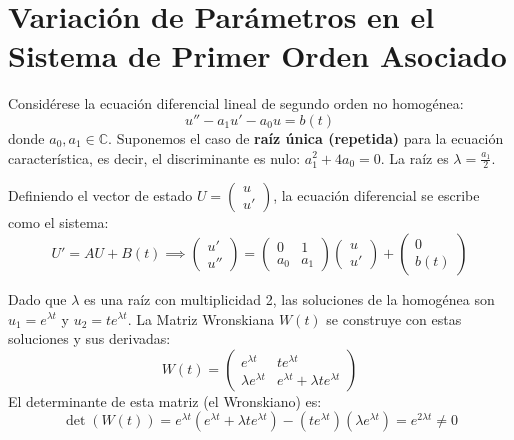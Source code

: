 \section*{Variación de Parámetros en el Sistema de Primer Orden Asociado}

Considérese la ecuación diferencial lineal de segundo orden no homogénea:
\[
    u'' - a_1 u' - a_0 u = b(t) \label{eq:edo_original}
\] 
donde $a_0, a_1 \in \mathbb{C}$. Suponemos el caso de \textbf{raíz única (repetida)} para la ecuación característica, es decir, el discriminante es nulo: $a_1^2 + 4a_0 = 0$. La raíz es $\lambda = \frac{a_1}{2}$.

Definiendo el vector de estado $U = \begin{pmatrix} u \\ u' \end{pmatrix}$, la ecuación diferencial se escribe como el sistema:
\[
    U' = A U + B(t) \implies 
    \begin{pmatrix} u' \\ u'' \end{pmatrix} = 
    \begin{pmatrix} 0 & 1 \\ a_0 & a_1 \end{pmatrix} 
    \begin{pmatrix} u \\ u' \end{pmatrix} + 
    \begin{pmatrix} 0 \\ b(t) \end{pmatrix}
\]

Dado que $\lambda$ es una raíz con multiplicidad 2, las soluciones de la homogénea son $u_1 = e^{\lambda t}$ y $u_2 = t e^{\lambda t}$. La Matriz Wronskiana $W(t)$ se construye con estas soluciones y sus derivadas:
\[
    W(t) = \begin{pmatrix}
        e^{\lambda t} & t e^{\lambda t} \\
        \lambda e^{\lambda t} & e^{\lambda t} + \lambda t e^{\lambda t}
    \end{pmatrix}
\]
El determinante de esta matriz (el Wronskiano) es:
\[
    \det (W(t)) = e^{\lambda t}(e^{\lambda t} + \lambda t e^{\lambda t}) - (t e^{\lambda t})(\lambda e^{\lambda t}) = e^{2 \lambda t} \neq 0
\]

